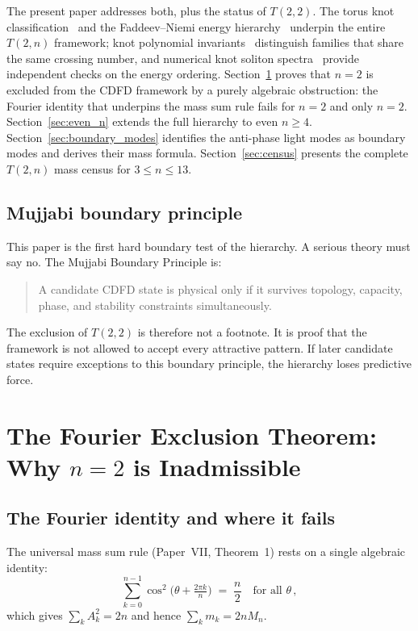 \documentclass[11pt]{article}
\begin{document}
The present paper addresses both, plus the status of $T(2,2)$.
The torus knot classification~\cite{Rolfsen1976} and the
Faddeev--Niemi energy hierarchy~\cite{FaddeevNiemi1997} underpin
the entire $T(2,n)$ framework; knot polynomial
invariants~\cite{Jones1985} distinguish families that share the
same crossing number, and numerical knot soliton
spectra~\cite{BattyeSutcliffe1998} provide independent checks
on the energy ordering.
Section~\ref{sec:exclusion} proves that $n = 2$ is excluded from the
CDFD framework by a purely algebraic obstruction: the Fourier identity
that underpins the mass sum rule fails for $n = 2$ and only $n = 2$.
Section~\ref{sec:even_n} extends the full hierarchy to even $n \geq 4$.
Section~\ref{sec:boundary_modes} identifies the anti-phase light modes
as boundary modes and derives their mass formula.
Section~\ref{sec:census} presents the complete $T(2,n)$ mass census for
$3 \leq n \leq 13$.

\subsection{Mujjabi boundary principle}

This paper is the first hard boundary test of the hierarchy. A serious theory
must say no. The Mujjabi Boundary Principle is:
\begin{quote}
A candidate CDFD state is physical only if it survives topology, capacity,
phase, and stability constraints simultaneously.
\end{quote}
The exclusion of $T(2,2)$ is therefore not a footnote. It is proof that the
framework is not allowed to accept every attractive pattern. If later candidate
states require exceptions to this boundary principle, the hierarchy loses
predictive force.


\section{The Fourier Exclusion Theorem: Why $n = 2$ is Inadmissible}
\label{sec:exclusion}

\subsection{The Fourier identity and where it fails}

The universal mass sum rule (Paper~VII, Theorem~1) rests on a single
algebraic identity:
\begin{equation}
  \sum_{k=0}^{n-1}\cos^2\!\bigl(\theta + \tfrac{2\pi k}{n}\bigr) \;=\; \frac{n}{2}
  \quad\text{for all }\theta\,,
  \label{eq:fourier_id}
\end{equation}
which gives $\sum_k A_k^2 = 2n$ and hence $\sum_k m_k = 2nM_n$.
\end{document}
